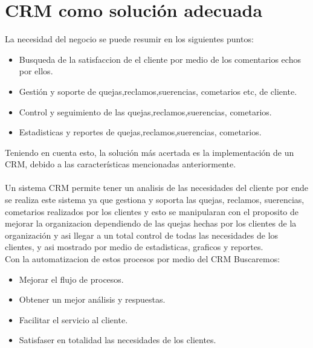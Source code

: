 \section{CRM como soluci\'on adecuada}
%
La necesidad del negocio se puede resumir en los siguientes puntos:%
%
\begin{itemize}
\item Busqueda de la satisfaccion de el cliente por medio de los comentarios echos por ellos.
\item Gesti\'on y soporte de quejas,reclamos,suerencias, cometarios etc, de cliente.
\item Control y seguimiento de las quejas,reclamos,suerencias, cometarios.
\item Estadisticas y reportes de quejas,reclamos,suerencias, cometarios.
\end{itemize}
%
Teniendo en cuenta esto, la soluci\'on m\'as acertada es la implementaci\'on de un CRM, debido a las caracter\'isticas mencionadas anteriormente.%
\\%
\\%
Un sistema CRM permite tener un analisis de las necesidades del cliente por ende se realiza este sistema ya que gestiona y soporta las quejas, reclamos, suerencias, cometarios realizados por los clientes y esto se manipularan con el proposito de mejorar la organizacion dependiendo de las quejas hechas por los clientes de la organizaci\'on y asi llegar a un total control de todas las necesidades de los clientes, y asi mostrado por medio de estadisticas, graficos y reportes.
\\%
Con la automatizacion  de estos procesos por medio del CRM Buscaremos:
%
\begin{itemize}
	\item Mejorar el flujo de procesos. 
	\item Obtener un mejor an\'alisis y respuestas.
	\item Facilitar el servicio al cliente.
	\item Satisfaser en totalidad las necesidades de los clientes.
\end{itemize}
%

